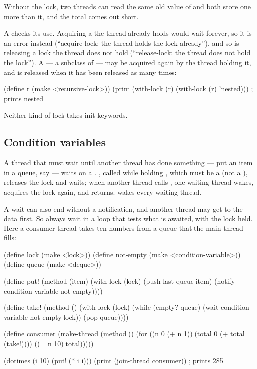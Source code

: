 Without the lock, two threads can read the same old value of
 and both store one more than it, and the total comes out
short.

A  checks its use. Acquiring a  the thread
already holds would wait forever, so it is an error instead
(``acquire-lock: the thread holds the lock already''), and so is
releasing a lock the thread does not hold (``release-lock: the thread
does not hold the lock''). A  --- a subclass of
 --- may be acquired again by the thread holding it, and is
released when it has been released as many times:

\begin{dylan}
(define r (make <recursive-lock>))
(print (with-lock (r) (with-lock (r) 'nested)))   ; prints nested
\end{dylan}

Neither kind of lock takes init-keywords.

\subsection{Condition variables}\label{sec:ext-condition-variables}

A thread that must wait until another thread has done something --- put
an item in a queue, say --- waits on a .
, called while
holding , which must be a  (not a
), releases the lock and waits; when another
thread calls , one waiting
thread wakes, acquires the lock again, and returns.
 wakes every waiting thread.

A wait can also end without a notification, and another thread may get
to the data first. So always wait in a loop that tests what is awaited,
with the lock held. Here a consumer thread takes ten numbers from a
queue that the main thread fills:

\begin{dylan}
(define lock (make <lock>))
(define not-empty (make <condition-variable>))
(define queue (make <deque>))

(define put!
  (method (item)
    (with-lock (lock)
      (push-last queue item)
      (notify-condition-variable not-empty))))

(define take!
  (method ()
    (with-lock (lock)
      (while (empty? queue)
        (wait-condition-variable not-empty lock))
      (pop queue))))

(define consumer
  (make-thread
    (method ()
      (for ((n 0 (+ n 1))
            (total 0 (+ total (take!))))
           ((= n 10) total)))))

(dotimes (i 10) (put! (* i i)))
(print (join-thread consumer))                  ; prints 285
\end{dylan}

